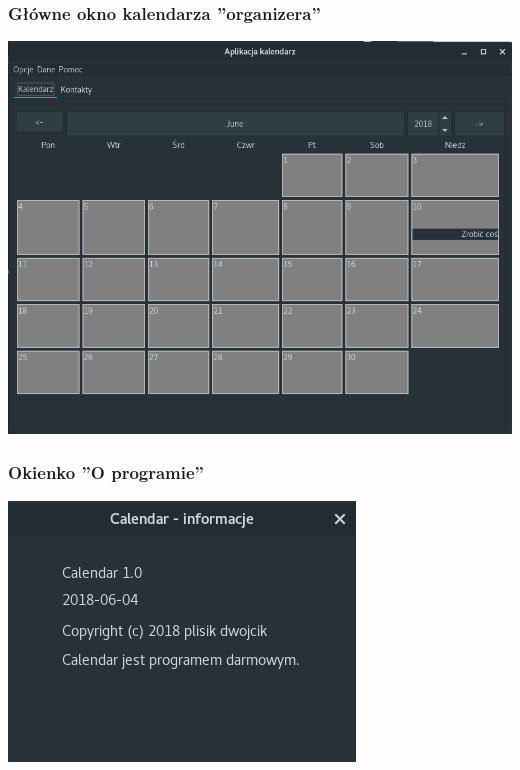 \documentclass[a4paper,12pt]{article}
\begin{document}
\subsubsection{Główne okno kalendarza ''organizera''}

\begin{minipage}{\textwidth}

    \includegraphics[width=\textwidth]{./screen/AppScreen/MainViewLinux.png}
    \label{MainViewLinux}

\end{minipage}

\subsubsection{Okienko ''O programie''}

\begin{center}
\begin{minipage}{0.5\textwidth}

    \includegraphics[width=\textwidth]{./screen/AppScreen/AboutDialog.png}
    \label{MainViewLinux}

\end{minipage}
\end{center}
\end{document}
